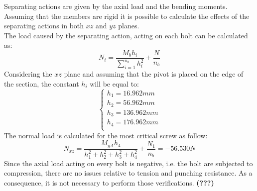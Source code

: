 Separating actions are given by the axial load and the bending moments.\\
Assuming that the members are rigid it is possible to calculate the effects of the separating actions in both $xz$ and $yz$ planes.\\
The load caused by the separating action, acting on each bolt can be calculated as:\\
\begin{equation*}
    N_{i} = \frac{M_{b}h_{i}}{\sum\limits_{i=1}^{n_{b}} h^2_{i}} + \frac{N}{n_{b}}
\end{equation*}
Considering the $xz$ plane and assuming that the pivot is placed on the edge of the section, the constant $     h_{i}$ will be equal to:
\begin{equation*}
   \begin{cases}
    h_{1} = 16.962 mm\\
    h_{2} = 56.962 mm\\
    h_{3} = 136.962 mm\\
    h_{4} = 176.962 mm\\
    \end{cases} 
\end{equation*}
The normal load is calculated for the most critical screw as follow:\\
\begin{equation*}
    N_{xz} = \frac{M_{yA}h_{4}}{h_{1}^{2}+h_{2}^{2}+h_{3}^{2}+h_{4}^{2}} + \frac{N_{1}}{n_{b}} = - 56.530 N
\end{equation*}
Since the axial load acting on every bolt is negative, i.e. the bolt are subjected to compression, there are no issues relative to tension and punching resistance. As a consequence, it is not necessary to perform those verifications. \textbf{(???)}

